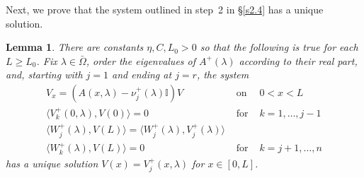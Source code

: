 \documentclass[10pt]{article}
\newtheorem{Lemma}{Lemma}[section]
\numberwithin{equation}{section}
\def\id{\mathbb{I}}
\begin{document}
Next, we prove that the system outlined in step~2 in \S\ref{s2.4} has a unique solution.

\begin{Lemma}\label{l2}
There are constants $\eta,C,L_0>0$ so that the following is true for each $L\geq L_0$. Fix $\lambda\in\bar\Omega$, order the eigenvalues of $A^+(\lambda)$ according to their real part, and, starting with $j=1$ and ending at $j=r$, the system
\begin{eqnarray}
V_x = (A(x,\lambda)-\nu^+_j(\lambda)\id)V & \mbox{ on } & 0<x<L \label{e31} \\ \label{e32}
\langle V^+_k(0,\lambda),V(0)\rangle = 0 & \mbox{ for } & k=1,\ldots,j-1 \\ \label{e33}
\langle W^+_j(\lambda),V(L)\rangle = \langle W^+_j(\lambda),V^+_j(\lambda)\rangle && \\ \label{e34}
\langle W^+_k(\lambda),V(L)\rangle = 0 & \mbox{ for } & k=j+1,\ldots,n
\end{eqnarray}
has a unique solution $V(x)=V^+_j(x,\lambda)$ for $x\in[0,L]$.
\end{Lemma}
\end{document}
